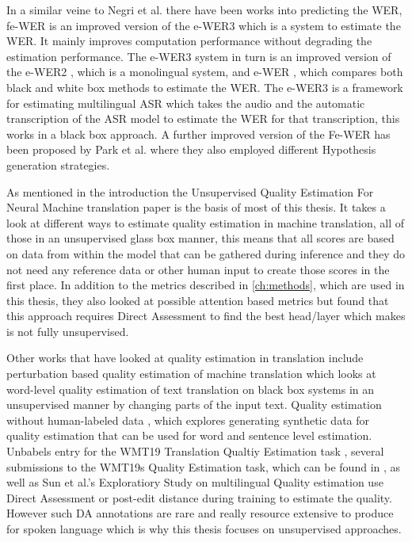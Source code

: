 In a similar veine to Negri et al.\cite{negri-etal-2014-quality} there have been works into predicting the WER, fe-WER\cite{park2023fastworderrorrate} is an improved version of the e-WER3 \cite{e-wer3} which is a system to estimate the WER. It mainly improves computation performance without degrading the estimation performance. 
The e-WER3 system in turn is an improved version of the e-WER2 \cite{ali2020worderrorrateestimation}, which is a monolingual system, and e-WER \cite{Ali2018WordER}, which compares both black and white box methods to estimate the WER. The e-WER3 is a framework for estimating multilingual ASR which takes the audio and the automatic transcription of the ASR model to estimate the WER for that transcription, this works in a black box approach. A further improved version of the Fe-WER has been proposed by Park et al. \cite{park2024automaticspeechrecognitionsystemindependent} where they also employed different Hypothesis generation strategies. 

As mentioned in the introduction the Unsupervised Quality Estimation For Neural Machine translation paper \cite{fomicheva2020unsupervised} is the basis of most of this thesis. It takes a look at different ways to estimate quality estimation in machine translation, all of those in an unsupervised glass box manner, this means that all scores are based on data from within the model that can be gathered during inference and they do not need any reference data or other human input to create those scores in the first place. In addition to the metrics described in \autoref{ch:methods}, which are used in this thesis, they also looked at possible attention based metrics but found that this approach requires Direct Assessment to find the best head/layer which makes is not fully unsupervised. 

Other works that have looked at quality estimation in translation include perturbation based quality estimation of machine translation \cite{dinh2023perturbationbasedqeexplainableunsupervised} which looks at word-level quality estimation of text translation on black box systems in an unsupervised manner by changing parts of the input text.  
Quality estimation without human-labeled data \cite{tuan-etal-2021-quality}, which explores generating synthetic data for quality estimation that can be used for word and sentence level estimation. 
Unbabels entry for the WMT19 Translation Qualtiy Estimation task \cite{kepler-etal-2019-unbabels}, several submissions to the WMT19s Quality Estimation task, which can be found in \cite{fonseca-etal-2019-findings}, as well as Sun et al.'s Exploratiory Study on multilingual Quality estimation \cite{sun-etal-2020-exploratory} use Direct Assessment or post-edit distance during training to estimate the quality. 
However such DA annotations are rare and really resource extensive to produce for spoken language which is why this thesis focuses on unsupervised approaches. 